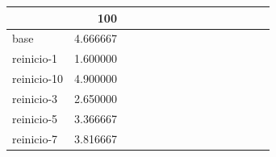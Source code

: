 \begin{tabular}{lrrrrrrrrrrrrrr}
\toprule
{} &  100 \\
\midrule
base        &  4.666667 \\
reinicio-1  &  1.600000 \\
reinicio-10 &  4.900000 \\
reinicio-3  &  2.650000 \\
reinicio-5  &  3.366667 \\
reinicio-7  &  3.816667 \\
\bottomrule
\end{tabular}
